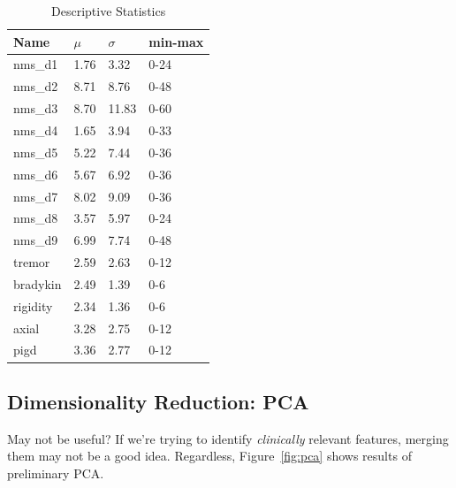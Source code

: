 \documentclass[letterpaper,12pt]{article}
\begin{document}
\begin{table}[h]
  \centering
  \begin{tabular}{l|l|l|l}
  Name  &       $\mu$ & $\sigma$ & min-max \\
         \hline
nms\_d1&   1.76&  3.32&   0-24 \\
nms\_d2&   8.71&  8.76&   0-48 \\
nms\_d3&   8.70& 11.83&   0-60 \\
nms\_d4&   1.65&  3.94&   0-33 \\
nms\_d5&   5.22&  7.44&   0-36 \\
nms\_d6&   5.67&  6.92&   0-36 \\
nms\_d7&   8.02&  9.09&   0-36 \\
nms\_d8&   3.57&  5.97&   0-24 \\
nms\_d9&   6.99&  7.74&   0-48 \\
tremor&   2.59&  2.63&   0-12 \\
bradykin& 2.49&  1.39&   0-6 \\
rigidity& 2.34&  1.36&   0-6 \\
axial&    3.28&  2.75&   0-12 \\
pigd&     3.36&  2.77&   0-12 \\
  \end{tabular}
  \caption{Descriptive Statistics}
  \label{tab:descriptive-statistics}
\end{table}

\subsection{Dimensionality Reduction: PCA}

May not be useful? If we're trying to identify \emph{clinically} relevant
features, merging them may not be a good idea. Regardless, Figure~\ref{fig:pca}
shows results of preliminary PCA.
\end{document}
